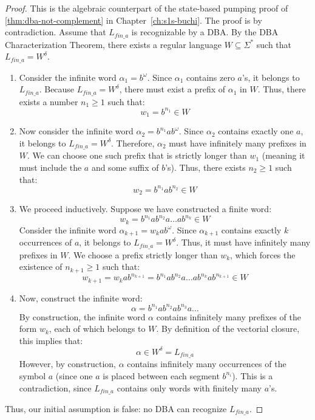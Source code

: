 \begin{proof}
This is the algebraic counterpart of the state-based pumping proof of \cref{thm:dba-not-complement} in Chapter~\ref{ch:s1s-buchi}. The proof is by contradiction. Assume that $L_{fin\_a}$ is recognizable by a DBA. By the DBA Characterization Theorem, there exists a regular language $W \subseteq \Sigma^*$ such that $L_{fin\_a} = W^\delta$.

\begin{enumerate}
    \item Consider the infinite word $\alpha_1 = b^\omega$. Since $\alpha_1$ contains zero $a$'s, it belongs to $L_{fin\_a}$. Because $L_{fin\_a} = W^\delta$, there must exist a prefix of $\alpha_1$ in $W$. Thus, there exists a number $n_1 \ge 1$ such that:
    $$w_1 = b^{n_1} \in W$$
    
    \item Now consider the infinite word $\alpha_2 = b^{n_1} a b^\omega$. Since $\alpha_2$ contains exactly one $a$, it belongs to $L_{fin\_a} = W^\delta$. Therefore, $\alpha_2$ must have infinitely many prefixes in $W$. We can choose one such prefix that is strictly longer than $w_1$ (meaning it must include the $a$ and some suffix of $b$'s). Thus, there exists $n_2 \ge 1$ such that:
    $$w_2 = b^{n_1} a b^{n_2} \in W$$
    
    \item We proceed inductively. Suppose we have constructed a finite word:
    $$w_k = b^{n_1} a b^{n_2} a \dots a b^{n_k} \in W$$
    Consider the infinite word $\alpha_{k+1} = w_k a b^\omega$. Since $\alpha_{k+1}$ contains exactly $k$ occurrences of $a$, it belongs to $L_{fin\_a} = W^\delta$. Thus, it must have infinitely many prefixes in $W$. We choose a prefix strictly longer than $w_k$, which forces the existence of $n_{k+1} \ge 1$ such that:
    $$w_{k+1} = w_k a b^{n_{k+1}} = b^{n_1} a b^{n_2} a \dots a b^{n_k} a b^{n_{k+1}} \in W$$
    
    \item Now, construct the infinite word:
    $$\alpha = b^{n_1} a b^{n_2} a b^{n_3} a \dots$$
    By construction, the infinite word $\alpha$ contains infinitely many prefixes of the form $w_k$, each of which belongs to $W$. By definition of the vectorial closure, this implies that:
    $$\alpha \in W^\delta = L_{fin\_a}$$
    However, by construction, $\alpha$ contains infinitely many occurrences of the symbol $a$ (since one $a$ is placed between each segment $b^{n_i}$). This is a contradiction, since $L_{fin\_a}$ contains only words with finitely many $a$'s.
\end{enumerate}
Thus, our initial assumption is false: no DBA can recognize $L_{fin\_a}$.
\end{proof}

